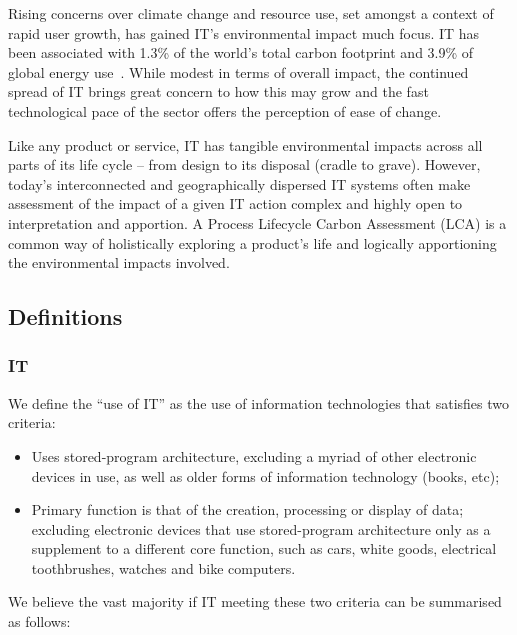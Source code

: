 \documentclass[conference]{IEEEtran}
\begin{document}
Rising concerns over climate change and resource use, set amongst a
context of rapid user growth, has gained IT's environmental impact
much focus. IT has been associated with 1.3\% of the world’s total
carbon footprint and 3.9\% of global energy
use~\cite{wheeland:2011}. While modest in terms of overall impact, the
continued spread of IT brings great concern to how this may grow and
the fast technological pace of the sector offers the perception of
ease of change.

Like any product or service, IT has tangible environmental impacts
across all parts of its life cycle -- from design to its disposal
(cradle to grave). However, today’s interconnected and geographically
dispersed IT systems often make assessment of the impact of a given IT
action complex and highly open to interpretation and apportion. A
Process Lifecycle Carbon Assessment (LCA) is a common way of
holistically exploring a product’s life and logically apportioning the
environmental impacts involved.

\subsection{Definitions}

\subsubsection{IT}

We define the ``use of IT'' as the use of information technologies
that satisfies two criteria:

\begin{itemize}
\item Uses stored-program architecture, excluding a myriad of other
  electronic devices in use, as well as older forms of information
  technology (books, etc);
\item Primary function is that of the creation, processing or display
  of data; excluding electronic devices that use stored-program
  architecture only as a supplement to a different core function, such
  as cars, white goods, electrical toothbrushes, watches and bike
  computers.
\end{itemize}

We believe the vast majority if IT meeting these two criteria can be
summarised as follows:
\end{document}
